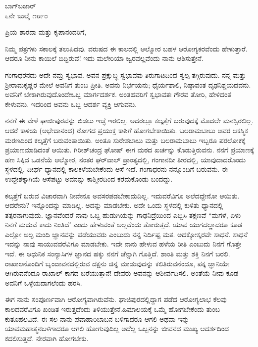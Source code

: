 \begin{flushright}
ಬಾಗ್‌ಬಜಾರ್\\ ೬ನೇ ಜುಲೈ ೧೮೯೦
\end{flushright}

\noindent
ಪ್ರಿಯ ಶಾರದಾ ಮತ್ತು ಕೃಪಾನಂದರಿಗೆ,

ನಿಮ್ಮ ಪತ್ರಗಳು ಸಕಾಲಕ್ಕೆ ತಲುಪಿದವು. ವರುಷದ ಈ ಕಾಲದಲ್ಲಿ ಆಲ್ಮೋರ ಬಹಳ ಆರೋಗ್ಯಕರವೆಂದು ಹೇಳುತ್ತಾರೆ. ಆದರೂ ನೀನು ಕಾಯಿಲೆ ಬಿದ್ದಿರುವೆ! ಇದು ಮಲೇರಿಯಾ ಜ್ವರವಲ್ಲವೆಂದು ನಾನು ಆಶಿಸುತ್ತೇನೆ.

ಗಂಗಾಧರನದು ಅದೇ ನಮ್ರ ಸ್ವಭಾವ. ಅವನ ಪ್ರಕ್ಷುಬ್ಧ ಸ್ವಭಾವವು ತಿರುಗಾಟದಿಂದ ಸ್ವಲ್ಪ ತಗ್ಗಿರುವುದು. ನನ್ನ ಮತ್ತು ಶ‍್ರೀರಾಮಕೃಷ್ಣರ ಮೇಲೆ ಅವನಿಗೆ ತುಂಬ ಪ್ರೀತಿ. ಅವನು ನಿರ್ಭಯನು; ಧೈರ್ಯಶಾಲಿ, ನಿಷ್ಠಾವಂತ ದೃಢನಿಶ್ಚಯದವನು. ಅವನಿಗೆ ಬೇಕಾಗಿರುವುದೊಂದೇ\enginline{-}ಒಬ್ಬ ಮಾರ್ಗದರ್ಶಕ. ಅಂತಹವರಿಗೆ ಸ್ವಭಾವತಃ ಗೌರವ ತೋರಿ, ಹೇಳಿದಂತೆ ಕೇಳುವನು. ಇದರಿಂದ ಅವನು ಒಬ್ಬ ಆದರ್ಶ ವ್ಯಕ್ತಿ ಆಗುವನು.

ನನಗೆ ಈ ವೇಳೆ ಘಾಜೀಪುರವನ್ನು ಬಿಡಲು ಇಚ್ಛೆ ಇರಲಿಲ್ಲ. ಅದರಲ್ಲೂ ಕಲ್ಕತ್ತೆಗೆ ಬರುವುದಕ್ಕೆ ಮೊದಲೇ ಮನಸ್ಸಿರಲಿಲ್ಲ. ಆದರೆ ಕಾಳಿಯ (ಅಭೇದಾನಂದ) ರೋಗದ ಪ್ರಯುಕ್ತ ಕಾಶಿಗೆ ಹೋಗಬೇಕಾಯಿತು. ಬಲರಾಮಬಾಬು ಅವರ ಆಕಸ್ಮಿಕ ಮರಣದಿಂದ ಕಲ್ಕತ್ತೆಗೆ ಬರುವಂತಾಯಿತು. ಅಂತೂ ಸುರೇಶಬಾಬು ಮತ್ತು ಬಲರಾಮಬಾಬು ಇಬ್ಬರೂ ಪರಲೋಕಕ್ಕೆ ಪ್ರಯಾಣಮಾಡಿದಂತೆ ಆಯಿತು. ಗಿರೀಶ್‌ಚಂದ್ರ ಘೋಷ್ ಈಗ ಮಠದ ಖರ್ಚನ್ನು ಕೊಡುತ್ತಿರುವನು. ನನಗೆ ಪ್ರಯಾಣಕ್ಕೆ ಹಣ ಸಿಕ್ಕಿದ ಒಡನೆಯೆ ಆಲ್ಮೋರ, ನಂತರ ಘರ್‌ವಾಲ್ ಪ್ರಾಂತ್ಯದಲ್ಲಿ, ಗಂಗಾನದೀ ತೀರದಲ್ಲಿ, ಯಾವುದಾದರೊಂದು ಸ್ಥಳದಲ್ಲಿ, ದೀರ್ಘ ಧ್ಯಾನದಲ್ಲಿ ಕಾಲಕಳೆಯಬೇಕೆಂದು ಆಸೆ ಇದೆ. ಗಂಗಾಧರನು ನನ್ನೊಂದಿಗೆ ಬರುವನು. ಈ ಉದ್ದೇಶಕ್ಕಾಗಿಯೆ ಆಸೆಪಟ್ಟು ಅವನನ್ನು ಕಾಶ್ಮೀರದಿಂದ ಕರೆದುಕೊಂಡು ಬಂದದ್ದು.

ಕಲ್ಕತ್ತೆಗೆ ಬರುವ ವಿಚಾರವಾಗಿ ನೀವೇನೂ ಅವಸರಪಡಬೇಕಾದುದಿಲ್ಲ. ಇದುವರೆವಿಗೂ ಅಲೆದದ್ದೇನೋ ಆಯಿತು. ಆದರೇನು? ಇನ್ನೊಂದನ್ನು ಮಾಡಿಲ್ಲ. ಅದನ್ನು ಮಾಡಬೇಕು. ಅದೇ ಒಂದು ಸ್ಥಳದಲ್ಲಿ ಕುಳಿತು ಧ್ಯಾನದಲ್ಲಿ ತತ್ಪರನಾಗುವುದು. ಜ್ಞಾನವೆಂದರೆ ನಾವು ಒಬ್ಬ ಹುಡುಗಿಯನ್ನು ಗಾಢನಿದ್ರೆಯಿಂದ ಎಬ್ಬಿಸಿ ತಕ್ಷಣವೆ “ಮಗಳೆ, ಏಳು ನಿನಗೆ ಮದುವೆ ಕಾದು ನಿಂತಿದೆ’ ಎಂದು ಹೇಳುವಂತೆ ಅಲ್ಲವೆಂದು ತೋರುತ್ತದೆ. ಯಾವ ಯುಗದಲ್ಲಾದರೂ ಕೂಡ ಎಲ್ಲೋ ಅಲ್ಪ ಮಂದಿ ಜ್ಞಾನವನ್ನು ಪಡೆಯುವರು ಎಂಬುದು ನನ್ನ ನಿರ್ದಿಷ್ಟ ಮತ. ಅದಕ್ಕೋಸ್ಕರವೇ ಸಾಧನೆ. ಸಾಧನೆ \enginline{-} ಇದನ್ನು ನಾವು ಸಾಯುವವರೆವಿಗೂ ಮಾಡಬೇಕು. ಇದೇ ನಾನು ಹೇಳುವ ಹಳೆಯ ರೀತಿ ಎಂಬುದು ನಿನಗೆ ಗೊತ್ತೇ ಇದೆ. ಈ ಆಧುನಿಕ ಸಂನ್ಯಾಸಿಗಳ ಜ್ಞಾನದ ಹಕ್ಕು ನನಗೆ ಚೆನ್ನಾಗಿ ಗೊತ್ತಿದೆ. ಶಾಂತಿ ಮತ್ತು ಶಕ್ತಿ ನಿನಗೆ ಬರಲಿ. ರಾಖಾಲನೊಂದಿಗೆ ಬೃಂದಾವನದಲ್ಲಿರುವ ದಕ್ಷನು ಚಿನ್ನ ಮಾಡುವುದನ್ನು ಕಲಿತಿರುವನೆಂದೂ, ಪಕ್ಕ ಜ್ಞಾನಿಯೇ ಆಗಿರುವನೆಂದೂ ರಾಖಾಲ್ ಕಾಗದ ಬರೆಯುತ್ತಾನೆ! ದೇವರು ಅವನನ್ನು ಆಶೀರ್ವದಿಸಲಿ. ಅಂತೆಯೆ ನೀವು ಕೂಡ ಅವನಿಗೆ ಒಳ್ಳೆಯದಾಗಲೆಂದು ಹರಸಿ.

ಈಗ ನಾನು ಸಂಪೂರ್ಣವಾಗಿ ಆರೋಗ್ಯವಾಗಿರುವೆನು. ಘಾಜಿಪುರದಲ್ಲಿದ್ದಾಗ ಪಡೆದ ಆರೋಗ್ಯಲಾಭ ಕೆಲವು ಕಾಲದವರೆವಿಗೂ ಖಂಡಿತ ಇರುತ್ತದೆಂದು ತಿಳಿಯುತ್ತೇನೆ.\break ಹಿಮಾಲಯಕ್ಕೆ ಒಮ್ಮೆ ಹೋಗಬೇಕೆಂದು ತುಂಬ ಕುತೂಹಲವಿದೆ. ಈ ಸಲ ನಾನು ಪವಾಹಾರಿಬಾಬನ ಬಳಿಗಾದರೂ ಆಗಲಿ ಅಥವಾ ಇನ್ನು ಯಾವಮಹಾತ್ಮನಬಳಿಗಾದರೂ ಆಗಲಿ ಹೋಗುವುದಿಲ್ಲ \enginline{-} ಅದೆಲ್ಲ ಒಬ್ಬನನ್ನು ಜೀವನದ ಮುಖ್ಯ ಆದರ್ಶದಿಂದ ಕದಲಿಸು\break ತ್ತದೆ. ನೇರವಾಗಿ ಹೋಗಬೇಕು.

